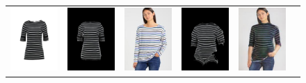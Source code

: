 

\begin{figure}[t]
   \centering
\begin{tabular}{lccccc}

\includegraphics[width=2cm]{figures/c2dw/000008_1.png}&
\includegraphics[width=2cm]{figures/c3drecon/000008_1_000303_0.png}&
\includegraphics[width=2cm]{figures/image/000303_0.jpg}&
\includegraphics[width=2cm]{figures/c3dwfull/000008_1_000303_0.png}&
\includegraphics[width=2cm]{figures/try-on/000008_1_000303_0.jpg}\\


\end{tabular}
\end{figure}
